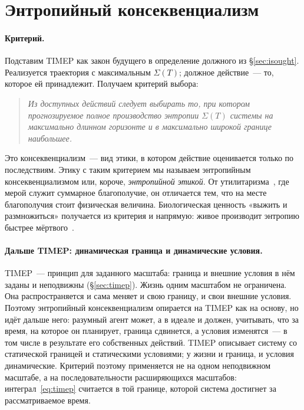 \documentclass[11pt,a4paper]{article}
\newcommand{\Sref}[1]{\hyperref[#1]{\S\ref{#1}}}
\begin{document}
\section{Энтропийный консеквенциализм}\label{sec:ec}

\paragraph{Критерий.}
Подставим TIMEP как закон будущего в определение должного из \Sref{sec:isought}. Реализуется траектория с максимальным $\Sigma(T)$; должное действие~--- то, которое ей принадлежит. Получаем критерий выбора:

\begin{quote}
\emph{Из доступных действий следует выбирать то, при котором прогнозируемое полное производство энтропии $\Sigma(T)$ системы на максимально длинном горизонте и в максимально широкой границе наибольшее.}
\end{quote}

Это консеквенциализм~--- вид этики, в котором действие оценивается только по последствиям. Этику с таким критерием мы называем энтропийным консеквенциализмом или, короче, \emph{энтропийной этикой}. От утилитаризма~\cite{bentham1789,mill1863}, где мерой служит суммарное благополучие, он отличается тем, что на месте благополучия стоит физическая величина. Биологическая ценность «выжить и размножиться» получается из критерия и напрямую: живое производит энтропию быстрее мёртвого~\cite{ulanowicz1987,schneider1994,kleidon2010}.

\paragraph{Дальше TIMEP: динамическая граница и динамические условия.}
TIMEP~--- принцип для заданного масштаба: граница и внешние условия в нём заданы и неподвижны (\Sref{sec:timep}). Жизнь одним масштабом не ограничена. Она распространяется и сама меняет и свою границу, и свои внешние условия. Поэтому энтропийный консеквенциализм опирается на TIMEP как на основу, но идёт дальше него: разумный агент может, а в идеале и должен, учитывать, что за время, на которое он планирует, граница сдвинется, а условия изменятся~--- в том числе в результате его собственных действий. TIMEP описывает систему со статической границей и статическими условиями; у жизни и граница, и условия динамические. Критерий поэтому применяется не на одном неподвижном масштабе, а на последовательности расширяющихся масштабов: интеграл~\eqref{eq:timep} считается в той границе, которой система достигнет за рассматриваемое время.
\end{document}
